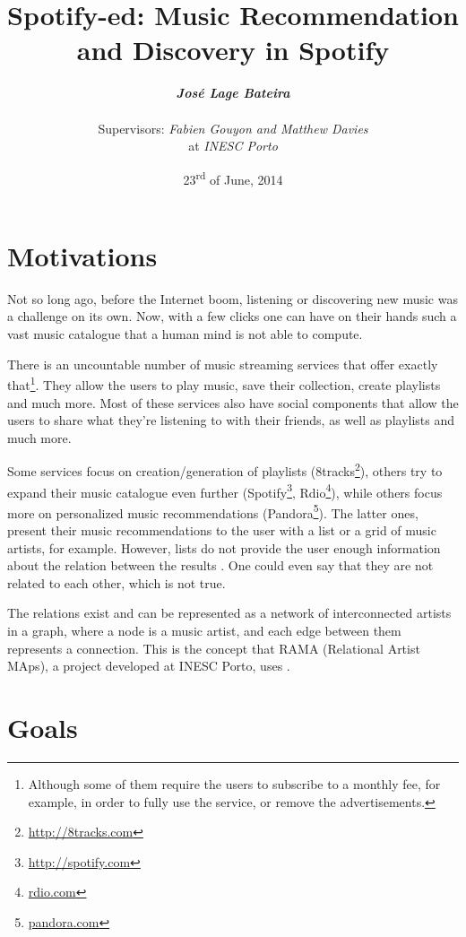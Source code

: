 \documentclass[twocolumn]{article}
\title{
  \huge
  \textbf{
    Spotify-ed: Music Recommendation and Discovery in Spotify
  }
}
\author{
  \large{\emph{\textbf{José Lage Bateira}}} \\ \\
  Supervisors: \emph{Fabien Gouyon and Matthew Davies}  \\
  at \emph{INESC Porto}
}
\date{23\textsuperscript{rd} of June, 2014}
\begin{document}
\maketitle

\thispagestyle{empty}

\section{Motivations}
\label{sec:motivations}

  Not so long ago, before the Internet boom, listening or discovering new music was a challenge on its own.
  Now, with a few clicks one can have on their hands such a vast music catalogue that a human mind is not able to compute.

  There is an uncountable number of music streaming services that offer exactly that\footnote{Although some of them require the users to subscribe to a monthly fee, for example, in order to fully use the service, or remove the advertisements.}.
  They allow the users to play music, save their collection, create playlists and much more.
  Most of these services also have social components that allow the users to share what they're listening to with their friends, as well as playlists and much more.

  Some services focus on creation/generation of playlists (8tracks\footnote{\url{http://8tracks.com}}), others try to expand their music catalogue even further (Spotify\footnote{\url{http://spotify.com}}, Rdio\footnote{\url{rdio.com}}), while others focus more on personalized music recommendations (Pandora\footnote{\url{pandora.com}}).
  The latter ones, present their music recommendations to the user with a list or a grid of music artists, for example.
  However, lists do not provide the user enough information about the relation between the results \cite{Lamere2008}.
  One could even say that they are not related to each other, which is not true.
  
  The relations exist and can be represented as a network of interconnected artists in a graph, where a node is a music artist, and each edge between them represents a connection.
  This is the concept that RAMA (Relational Artist MAps), a project developed at INESC Porto, uses \cite{Costa2008} \cite{Sarmento2009} \cite{Costa2009} \cite{Gouyon2011}.
  

\section{Goals}
\label{sec:goals}
\end{document}
